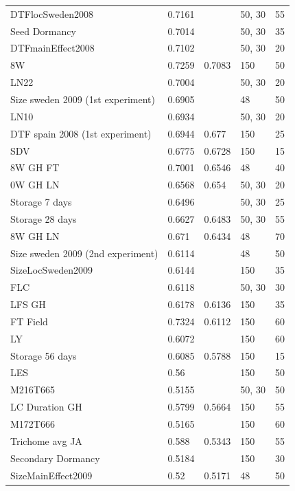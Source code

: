 \begin{longtable}{p{} p{} p{} p{} p{}}
  DTFlocSweden2008 & 0.7161 & \color{red}{0.7271} & 50, 30 & 55 \\
  Seed Dormancy & 0.7014 & \color{red}{0.7241} & 50, 30 & 35 \\
  DTFmainEffect2008 & 0.7102 & \color{red}{0.7142} & 50, 30 & 20 \\
  8W & 0.7259 & 0.7083 & 150 & 50 \\
  LN22 & 0.7004 & \color{red}{0.7069} & 50, 30 & 20 \\
  Size sweden 2009 (1st experiment) & 0.6905 & \color{red}{0.6994} & 48 & 50 \\
  LN10 & 0.6934 & \color{red}{0.698} & 50, 30 & 20 \\
  DTF spain 2008 (1st experiment) & 0.6944 & 0.677 & 150 & 25 \\
  SDV & 0.6775 & 0.6728 & 150 & 15 \\
  8W GH FT & 0.7001 & 0.6546 & 48 & 40 \\
  0W GH LN & 0.6568 & 0.654 & 50, 30 & 20 \\
  Storage 7 days & 0.6496 & \color{red}{0.65} & 50, 30 & 25 \\
  Storage 28 days & 0.6627 & 0.6483 & 50, 30 & 55 \\
  8W GH LN & 0.671 & 0.6434 & 48 & 70 \\
  Size sweden 2009 (2nd experiment) & 0.6114 & \color{red}{0.6268} & 48 & 50 \\
  SizeLocSweden2009 & 0.6144 & \color{red}{0.619} & 150 & 35 \\
  FLC & 0.6118 & \color{red}{0.6161} & 50, 30 & 30 \\
  LFS GH & 0.6178 & 0.6136 & 150 & 35 \\
  FT Field & 0.7324 & 0.6112 & 150 & 60 \\
  LY  & 0.6072 & \color{red}{0.6088} & 150 & 60 \\
  Storage 56 days & 0.6085 & 0.5788 & 150 & 15 \\
  LES & 0.56 & \color{red}{0.5764} & 150 & 50 \\
  M216T665 & 0.5155 & \color{red}{0.5674} & 50, 30 & 50 \\
  LC Duration GH & 0.5799 & 0.5664 & 150 & 55 \\
  M172T666 & 0.5165 & \color{red}{0.5487} & 150 & 60 \\
  Trichome avg JA & 0.588 & 0.5343 & 150 & 55 \\
  Secondary Dormancy & 0.5184 & \color{red}{0.5264} & 150 & 30 \\
  SizeMainEffect2009 & 0.52 & 0.5171 & 48 & 50 \\

\end{longtable}
